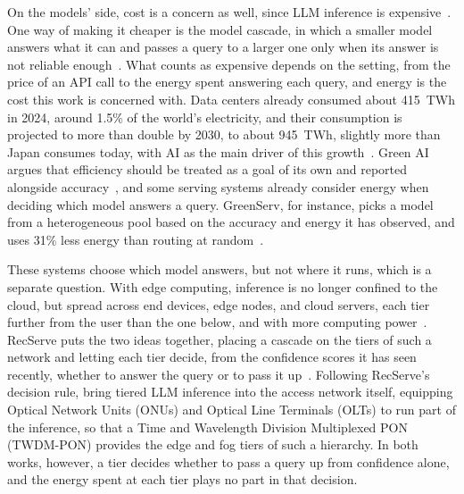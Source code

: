 \documentclass[cic,dipl,english]{infufrgs}
\begin{document}
On the models' side, cost is a concern as well, since LLM inference is
expensive~\cite{chen2026network}. One way of making it cheaper is the model cascade,
in which a smaller model answers what it can and passes a query to a larger one only when
its answer is not reliable enough~\cite{chen2024frugalgpt}. What counts as expensive
depends on the setting, from the price of an API call to the energy spent answering
each query, and energy is the cost this work is concerned with. Data centers already
consumed about 415~TWh in 2024, around 1.5\% of the world's electricity, and their
consumption is projected to more than double by 2030, to about 945~TWh, slightly more
than Japan consumes today, with AI as the main driver of this
growth~\cite{iea2025energy}. Green AI argues that efficiency should be treated as a goal
of its own and reported alongside accuracy~\cite{schwartz2020green}, and some serving
systems already consider energy when
deciding which model answers a query. GreenServ, for instance, picks a model from a heterogeneous
pool based on the accuracy and energy it has observed, and uses 31\% less energy than
routing at random~\cite{ziller2026greenserv}.

These systems choose which model answers, but not where it runs, which is a separate
question. With edge computing, inference is no longer confined to the cloud, but spread
across end devices, edge nodes, and cloud servers, each tier further from the user than
the one below, and with more computing power~\cite{chen2026network}. RecServe puts the two ideas together, placing a cascade on
the tiers of such a network and letting each tier decide, from the confidence scores it
has seen recently, whether to answer the query or to pass it up~\cite{wu2025recserve}.
Following RecServe's decision rule,  bring tiered
LLM inference into the access network itself, equipping Optical Network Units (ONUs)
and Optical Line Terminals (OLTs) to run part of the inference, so that a Time and
Wavelength Division Multiplexed PON (TWDM-PON) provides the edge and fog tiers of
such a hierarchy. In both works, however, a tier decides whether to pass a query up
from confidence alone, and the energy spent at each tier plays no part in that
decision.
\end{document}
